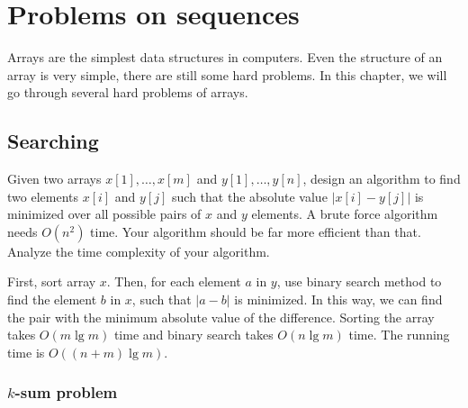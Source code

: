 \chapter{Problems on sequences}
Arrays are the simplest data structures in computers. Even the structure of an array is very simple, there are still some hard problems. In this chapter, we will go through several hard problems of arrays.

\section{Searching}

\begin{Exercise}
Given two arrays $x[1], \dots, x[m]$ and $y[1], \dots, y[n]$, design an algorithm to find two elements $x[i]$ and $y[j]$ such that the absolute value $|x[i] - y[j]|$ is minimized over all possible pairs of $x$ and $y$ elements. A brute force algorithm needs $O(n^2)$ time. Your algorithm should be far more efficient than that. Analyze the time complexity of your algorithm.
\end{Exercise}
\begin{Answer}
First, sort array $x$. Then, for each element $a$ in $y$, use binary search method to find the element $b$ in $x$, such that $|a - b|$ is minimized. In this way, we can find the pair with the minimum absolute value of the difference. Sorting the array takes $O(m \lg m)$ time and binary search takes $O(n \lg m)$ time. The running time is $O((n + m) \lg m)$.
\end{Answer}

\subsection{$k$-sum problem}

